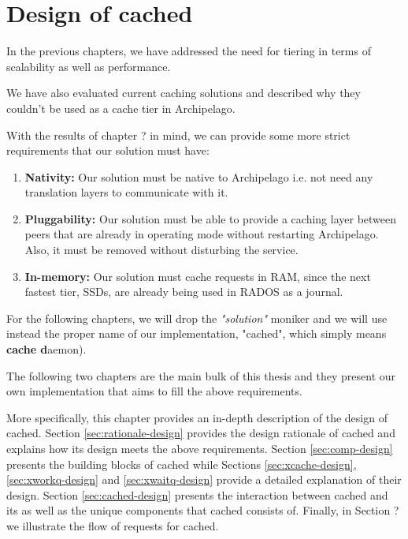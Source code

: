 \chapter{Design of cached}\label{ch:cached-design}

In the previous chapters, we have addressed the need for tiering in terms of
scalability as well as performance. %

We have also evaluated current caching solutions and described why they couldn't 
be used as a cache tier in Archipelago. %

With the results of chapter ? in mind, we can provide some more strict 
requirements that our solution must have:

\begin{enumerate}
	\item \textbf{Nativity:} Our solution must be native to Archipelago i.e.  
		not need any translation layers to communicate with it.
	\item \textbf{Pluggability:} Our solution must be able to provide a 
		caching layer between peers that are already in operating mode 
		without restarting Archipelago. Also, it must be removed 
		without disturbing the service.
	\item \textbf{In-memory:} Our solution must cache requests in RAM, 
		since the next fastest tier, SSDs, are already being used in 
		RADOS as a journal.
\end{enumerate}

For the following chapters, we will drop the \textit{"solution"} moniker and we 
will use instead the proper name of our implementation, "cached", which simply 
means \textbf{cache d}aemon).

The following two chapters are the main bulk of this thesis and they present our 
own implementation that aims to fill the above requirements.

More specifically, this chapter provides an in-depth description of the design 
of cached. Section \ref{sec:rationale-design} provides the design rationale of 
cached and explains how its design meets the above requirements. Section 
\ref{sec:comp-design} presents the building blocks of cached while Sections 
\ref{sec:xcache-design}, \ref{sec:xworkq-design} and \ref{sec:xwaitq-design} 
provide a detailed explanation of their design. Section \ref{sec:cached-design}  
presents the interaction between cached and its  as well as the unique 
components that cached consists of.  Finally, in Section ?  we illustrate the 
flow of requests for cached.

